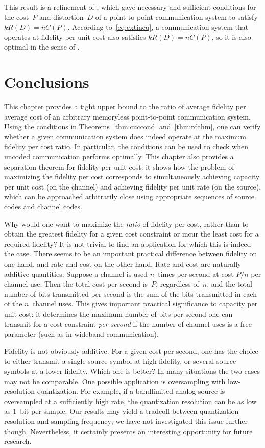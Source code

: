 This result is a refinement of , which gave
necessary and sufficient conditions for the cost~$P$ and distortion~$D$ of a
point-to-point communication system to satisfy $k R(D) = n C(P)$. According
to~\eqref{eq:extineq}, a communication system that operates at fidelity per unit
cost also satisfies $k R(D) = n C(P)$, so it is also optimal in the sense of
.


\section{Conclusions}

This chapter provides a tight upper bound to the ratio of average fidelity per
average cost of an arbitrary memoryless point-to-point communication system.
Using the conditions in Theorems~\ref{thm:cuccond} and~\ref{thm:rdthm}, one can
verify whether a given communication system does indeed operate at the maximum
fidelity per cost ratio. In particular, the conditions can be used to check when
uncoded communication performs optimally. This chapter also provides a
separation theorem for fidelity per unit cost: it shows how the problem of
maximizing the fidelity per cost corresponds to simultaneously achieving
capacity per unit cost (on the channel) and achieving fidelity per unit rate (on
the source), which can be approached arbitrarily close using appropriate
sequences of source codes and channel codes.

Why would one want to maximize the \emph{ratio} of fidelity per cost, rather
than to obtain the greatest fidelity for a given cost constraint or incur the
least cost for a required fidelity? It is not trivial to find an application for
which this is indeed the case. There seems to be an important practical
difference between fidelity on one hand, and rate and cost on the other hand.
Rate and cost are naturally additive quantities. Suppose a channel is used
$n$~times per second at cost $P/n$ per channel use. Then the total cost per
second is~$P$, regardless of~$n$, and the total number of bits transmitted per
second is the sum of the bits transmitted in each of the $n$~channel uses. This
gives important practical significance to capacity per unit cost: it determines
the maximum number of bits per second one can transmit for a cost constraint
\emph{per second} if the number of channel uses is a free parameter (such as in
wideband communication). 

Fidelity is not obviously additive. For a given cost per second, one has the
choice to either transmit a single source symbol at high fidelity, or several
source symbols at a lower fidelity.  Which one is better? In many situations the
two cases may not be comparable. One possible application is oversampling with
low-resolution quantization.  For example, if a bandlimited analog source is
oversampled at a sufficiently high rate, the quantization resolution can be as
low as $1$~bit per sample. Our results may yield a tradeoff between quantization
resolution and sampling frequency; we have not investigated this issue further
though.  Nevertheless, it certainly presents an interesting opportunity for
future research. 

